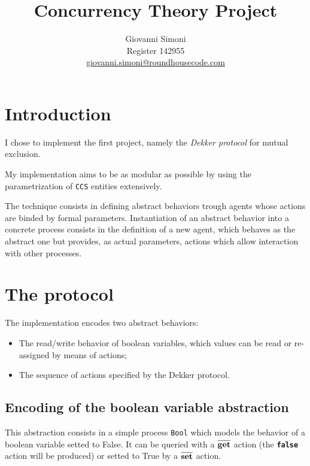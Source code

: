 \documentclass[10pt,a4paper]{article}
\title {
    Concurrency Theory Project
}
\author{
    Giovanni Simoni\\
    Register 142955\\
    \href{mailto:giovanni.simoni@roundhousecode.com}
         {giovanni.simoni@roundhousecode.com}
}
\newcommand{\CCS}{{\tt CCS}}
\newcommand{\Agent}[1]{{\tt {#1}}}
\newcommand{\Action}[1]{{\tt \bf {#1}}}
\newcommand{\CoAction}[1]{$\overline{\mbox{\Action{#1}}}$}
\begin{document}
\maketitle

\section{Introduction}
\label{sec:Intro}

    I chose to implement the first project, namely the \emph{Dekker
    protocol} for mutual exclusion.

    My implementation aims to be as modular as possible by using the
    parametrization of \CCS{} entities extensively.

    The technique consists in defining abstract behaviors trough agents
    whose actions are binded by formal parameters. Instantiation of an
    abstract behavior into a concrete process consists in the definition
    of a new agent, which behaves as the abstract one but provides, as
    actual parameters, actions which allow interaction with other
    processes.

\section{The protocol}

    The implementation encodes two abstract behaviors:

    \begin{itemize}

    \item   The read/write behavior of boolean variables, which values can
            be read or re-assigned by means of actions;

    \item   The sequence of actions specified by the Dekker
            protocol.

    \end{itemize}

    \subsection{Encoding of the boolean variable abstraction}
    \label{sub:EncodeBool}

        This abstraction consists in a simple process \Agent{Bool} which
        models the behavior of a boolean variable setted to False. It can
        be queried with a \CoAction{get} action (the \Action{false} action
        will be produced) or setted to True by a \CoAction{set} action.
\end{document}
